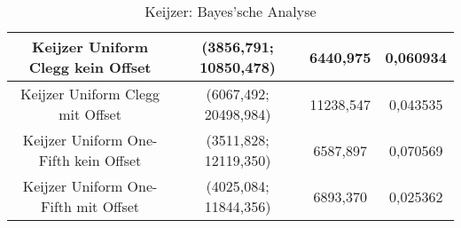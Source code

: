\begin{table}[H]
\begin{tabular}{c | c | c | c}
		\hline
		Keijzer Uniform Clegg kein Offset & (3856,791; 10850,478) & 6440,975 & 0,060934\\
		\hline
		Keijzer Uniform Clegg mit Offset & \color{red}(6067,492; 20498,984)\color{black} & \color{red}11238,547\color{black} & \color{red}0,043535\color{black}\\
		\hline
		Keijzer Uniform One-Fifth kein Offset & (3511,828; 12119,350) & 6587,897 & \color{Green}0,070569\color{black}\\
		\hline
		Keijzer Uniform One-Fifth mit Offset & (4025,084; 11844,356) & 6893,370 & \color{red}0,025362\color{black}\\
	\end{tabular}
	\caption{Keijzer: Bayes'sche Analyse}
	\label{table:keijzerBayesian}
\end{table}


